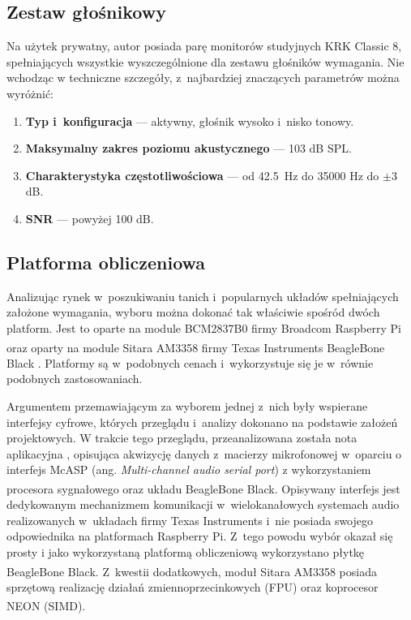 \subsection{Zestaw głośnikowy}

Na użytek prywatny, autor posiada parę monitorów studyjnych KRK Classic 8,
spełniających wszystkie wyszczególnione dla zestawu głośników wymagania. Nie
wchodząc w techniczne szczegóły, z~najbardziej znaczących parametrów
\cite{bib:krk} można wyróżnić:

\begin{enumerate}
    \item \textbf{Typ i~konfiguracja} --- aktywny, głośnik wysoko i~nisko tonowy.
    \item \textbf{Maksymalny zakres poziomu akustycznego} --- 103 dB SPL.
    \item \textbf{Charakterystyka częstotliwościowa} --- od 42.5~Hz do 35000 Hz
    do $\pm 3$ dB.
    \item \textbf{SNR} --- powyżej 100 dB.
\end{enumerate}

\subsection{Platforma obliczeniowa}

Analizując rynek w~poszukiwaniu tanich i~popularnych układów spełniających
założone wymagania, wyboru można dokonać tak właściwie spośród dwóch platform.
Jest to oparte na module BCM2837B0 firmy Broadcom Raspberry Pi \cite{bib:rpi}
oraz oparty na module Sitara AM3358 firmy Texas Instruments
BeagleBone\textsuperscript{\textregistered} Black \cite{bib:bbb}. Platformy są
w~podobnych cenach i~wykorzystuje się je w~równie podobnych zastosowaniach. \par
Argumentem przemawiającym za wyborem jednej z~nich były wspierane interfejsy
cyfrowe, których przeglądu i~analizy dokonano na podstawie założeń projektowych.
W trakcie tego przeglądu, przeanalizowana została nota aplikacyjna
\cite{bib:sitara}, opisująca akwizycję danych z~macierzy mikrofonowej w~oparciu
o interfejs McASP (ang. \textit{Multi-channel audio serial port}) z
wykorzystaniem procesora sygnałowego oraz układu
BeagleBone\textsuperscript{\textregistered} Black. Opisywany interfejs jest
dedykowanym mechanizmem komunikacji w~wielokanałowych systemach audio
realizowanych w~układach firmy Texas Instruments i~nie posiada swojego
odpowiednika na platformach Raspberry Pi. Z~tego powodu wybór okazał się prosty
i jako wykorzystaną platformą obliczeniową wykorzystano płytkę
BeagleBone\textsuperscript{\textregistered} Black. Z~kwestii dodatkowych, moduł
Sitara AM3358 posiada sprzętową realizację działań zmiennoprzecinkowych (FPU)
oraz koprocesor NEON\textsuperscript{\texttrademark} (SIMD).

